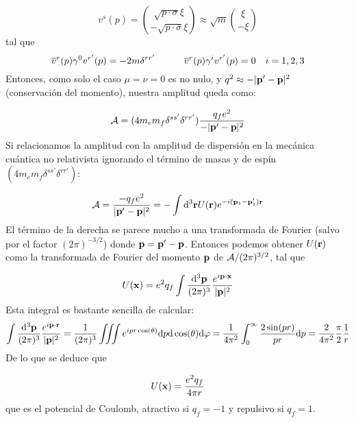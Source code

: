 \begin{solucion}
 	
 	\begin{equation*}
 		v^s(p) = \binom{\sqrt{p \cdot \sigma} \xi }{-\sqrt{p \cdot \overline{\sigma}} \xi } \approx \sqrt{m} \binom{\xi}{-\xi}
 	\end{equation*}
 	tal que 
 	\begin{equation*}
 		\overline{v}^{r}(p) \gamma^0 v^{r'}(p) = -2m \delta^{rr'}  \quad \quad \quad
 		\overline{v}^{r}(p) \gamma^i v^{r'}(p) = 0 \quad i=1,2,3
 	\end{equation*}
 	Entonces, como solo el caso $\mu=\nu=0$ es no nulo, y $q^2 \approx -|\mathbf{p}'-\mathbf{p}|^2$ (conservación del momento), nuestra amplitud queda como:
	
	\begin{equation*}
		\mathcal{A} =  ( 4 m_e m_f \delta^{ss'}\delta^{rr'} ) \frac{q_f e^2}{-|\mathbf{p}'-\mathbf{p}|^2}
	\end{equation*}
	Si relacionamos la amplitud con la amplitud de dispersión en la mecánica cuántica no relativista ignorando el término de masas y de espín $( 4 m_e m_f \delta^{ss'}\delta^{rr'} )$:
	
	\begin{equation*}
		\mathcal{A} = \frac{-q_f e^2}{|\mathbf{p}'-\mathbf{p}|^2} = - \int \mathrm{d}^3 \mathbf{r} U(\mathbf{r}) e^{-i(\mathbf{p}_1-\mathbf{p}_1')\mathbf{r}}
	\end{equation*}
	El término de la derecha se parece mucho a una transformada de Fourier (salvo por el factor $(2\pi)^{-3/2}$) donde $\mathbf{p}=\mathbf{p}'-\mathbf{p}$. Entonces podemos obtener $U(\mathbf{r})$ como la transformada de Fourier del momento $\mathbf{p}$ de $\mathcal{A}/(2\pi)^{3/2}$, tal que 
	
	\begin{equation*}
		U(\mathbf{x}) = e^2 q_f \int \frac{\mathrm{d}^3 \mathbf{p}}{(2\pi)^3} \frac{e^{i\mathbf{p} \cdot \mathbf{x}}}{|\mathbf{p}|^2}
	\end{equation*}
	Esta integral es bastante sencilla de calcular:
	\begin{equation*}
		\int \frac{\mathrm{d}^3 \mathbf{p}}{(2\pi)^3} \frac{e^{i\mathbf{p} \cdot \mathbf{r}}}{|\mathbf{p}|^2} = \frac{1}{(2\pi)^3} \iiint e^{i p r \cos (\theta)} \mathrm{d} p \mathrm{d} \cos(\theta) \mathrm{d} \varphi = \frac{1}{4\pi^2} \int_0^\infty \frac{2\sin(pr)}{pr}  \mathrm{d} p = \frac{2}{4\pi^2} \frac{\pi}{2} \frac{1}{r}
	\end{equation*}
	De lo que se deduce que
	
	\begin{equation*}
		U(\mathbf{x}) = \frac{e^2 q_f}{4\pi r}
	\end{equation*}
	que es el potencial de Coulomb, atractivo si $q_f=-1$ y repulsivo si $q_f=1$.
\end{solucion}




